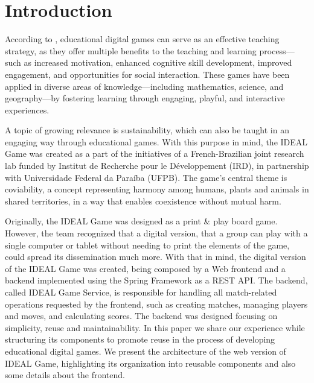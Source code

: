 \documentclass[english]{sbc2025}
\begin{document}

\section{Introduction}
According to \citep{savi2008jogos}, educational digital games can serve as an effective teaching strategy, as they offer multiple benefits to the teaching and learning process—such as increased motivation, enhanced cognitive skill development, improved engagement, and opportunities for social interaction. These games have been applied in diverse areas of knowledge—including mathematics, science, and geography—by fostering learning through engaging, playful, and interactive experiences.


A topic of growing relevance is sustainability, which can also be taught  in an engaging way through educational games. With this purpose in mind,  the IDEAL Game was created as a part of the initiatives of a French-Brazilian joint research lab funded by Institut de Recherche pour le Développement (IRD), in partnership with Universidade Federal da Paraíba (UFPB). The game’s central theme is coviability, a concept representing harmony among humans, plants and animals in shared territories, in a way that enables coexistence without mutual harm. 

Originally, the IDEAL Game was designed as a print \& play board game. However, the team recognized that a digital version, that a group can play with a single computer or tablet without needing to print the elements of the game, could spread its dissemination much more. With that in mind, the digital version of the IDEAL Game was created, being composed by a Web frontend and a backend implemented using the Spring Framework as a REST API. The backend, called IDEAL Game Service, is responsible for handling all match-related operations requested by the frontend, such as creating matches, managing players and moves, and calculating scores. The backend was designed focusing on simplicity, reuse and maintainability. In this paper we share our experience while structuring its components to promote reuse in the process of developing educational digital games. We present the architecture of the web version of IDEAL Game, highlighting its organization into reusable components and also some details about the frontend. 
\end{document}
